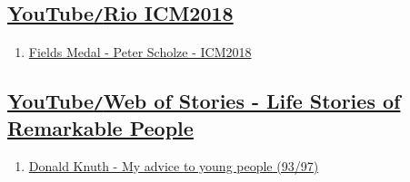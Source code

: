 \documentclass{article}
\begin{document}

\subsection{\href{https://www.youtube.com/channel/UCnMLdlOoLICBNcEzjMLOc7w}{YouTube\texttt{/}Rio ICM2018}}
\begin{enumerate}
	\item \href{https://www.youtube.com/watch?v=yEVlCZTqht8}{Fields Medal - Peter Scholze - ICM2018}
\end{enumerate}


\subsection{\href{https://www.youtube.com/channel/UCrN1lcGgsCB9axGjZjpOqiQ}{YouTube\texttt{/}Web of Stories - Life Stories of Remarkable People}}
\begin{enumerate}
	\item \href{https://www.youtube.com/watch?v=75Ju0eM5T2c}{Donald Knuth - My advice to young people (93/97)}
\end{enumerate}
\end{document}
